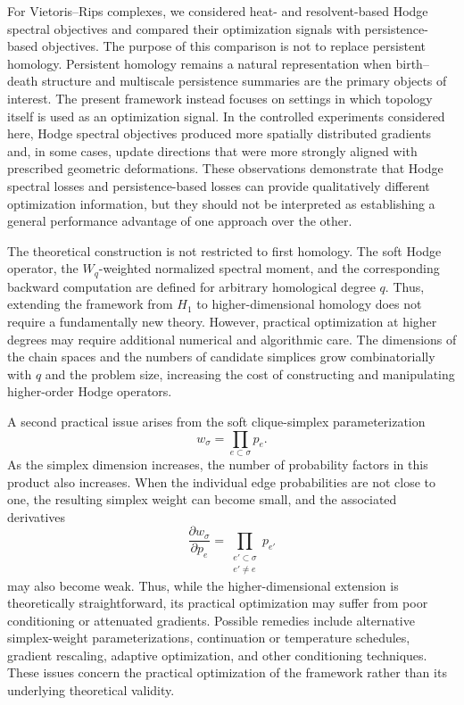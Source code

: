 \documentclass[pdflatex,sn-mathphys-num]{sn-jnl}%
\theoremstyle{thmstyleone}%
\theoremstyle{thmstyletwo}%
\theoremstyle{thmstylethree}%
\begin{document}
For Vietoris--Rips complexes, we considered heat- and resolvent-based Hodge spectral objectives and compared their optimization signals with persistence-based objectives.
The purpose of this comparison is not to replace persistent homology.
Persistent homology remains a natural representation when birth--death structure and multiscale persistence summaries are the primary objects of interest.
The present framework instead focuses on settings in which topology itself is used as an optimization signal.
In the controlled experiments considered here, Hodge spectral objectives produced more spatially distributed gradients and, in some cases, update directions that were more strongly aligned with prescribed geometric deformations.
These observations demonstrate that Hodge spectral losses and persistence-based losses can provide qualitatively different optimization information, but they should not be interpreted as establishing a general performance advantage of one approach over the other.

The theoretical construction is not restricted to first homology.
The soft Hodge operator, the \(W_q\)-weighted normalized spectral moment, and the corresponding backward computation are defined for arbitrary homological degree \(q\).
Thus, extending the framework from \(H_1\) to higher-dimensional homology does not require a fundamentally new theory.
However, practical optimization at higher degrees may require additional numerical and algorithmic care.
The dimensions of the chain spaces and the numbers of candidate simplices grow combinatorially with \(q\) and the problem size, increasing the cost of constructing and manipulating higher-order Hodge operators.

A second practical issue arises from the soft clique-simplex parameterization
\[
w_\sigma
=
\prod_{e\subset\sigma}p_e.
\]
As the simplex dimension increases, the number of probability factors in this product also increases.
When the individual edge probabilities are not close to one, the resulting simplex weight can become small, and the associated derivatives
\[
\frac{\partial w_\sigma}{\partial p_e}
=
\prod_{\substack{e'\subset\sigma\\e'\neq e}}p_{e'}
\]
may also become weak.
Thus, while the higher-dimensional extension is theoretically straightforward, its practical optimization may suffer from poor conditioning or attenuated gradients.
Possible remedies include alternative simplex-weight parameterizations, continuation or temperature schedules, gradient rescaling, adaptive optimization, and other conditioning techniques.
These issues concern the practical optimization of the framework rather than its underlying theoretical validity.
\end{document}
